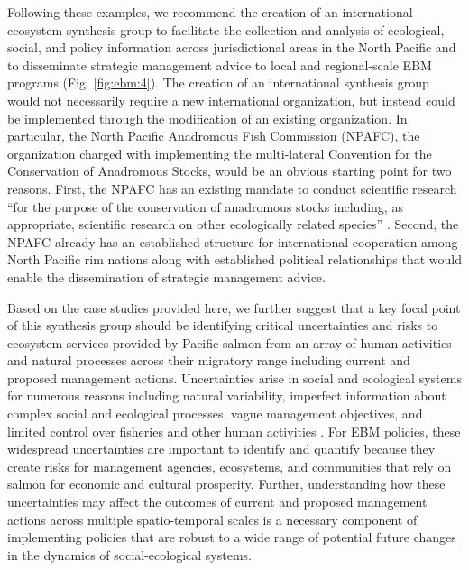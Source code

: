 Following these examples, we recommend the creation of an international
ecosystem synthesis group to facilitate the collection and analysis of
ecological, social, and policy information across jurisdictional areas in the
North Pacific and to disseminate strategic management advice to local and
regional-scale EBM programs (Fig. \ref{fig:ebm:4}). The creation of an
international synthesis group would not necessarily require a new international
organization, but instead could be implemented through the modification of an
existing organization. In particular, the North Pacific Anadromous Fish
Commission (NPAFC), the organization charged with implementing the multi-lateral
Convention for the Conservation of Anadromous Stocks, would be an obvious
starting point for two reasons. First, the NPAFC has an existing mandate to
conduct scientific research ``for the purpose of the conservation of anadromous
stocks including, as appropriate, scientific research on other ecologically
related species'' \citep{CCAS1992}. Second, the NPAFC already has an established
structure for international cooperation among North Pacific rim nations along
with established political relationships that would enable the dissemination of
strategic management advice.

Based on the case studies provided here, we further suggest that a key
focal point of this synthesis group should be identifying critical
uncertainties and risks to ecosystem services provided by Pacific salmon
from an array of human activities and natural processes across their
migratory range including current and proposed management actions.
Uncertainties arise in social and ecological systems for numerous
reasons including natural variability, imperfect information about
complex social and ecological processes, vague management objectives,
and limited control over fisheries and other human activities
\citep{Peterman2004a}. For EBM policies, these widespread uncertainties
are important to identify and quantify because they create risks for
management agencies, ecosystems, and communities that rely on salmon for
economic and cultural prosperity. Further, understanding how these
uncertainties may affect the outcomes of current and proposed management
actions across multiple spatio-temporal scales is a necessary component
of implementing policies that are robust to a wide range of potential
future changes in the dynamics of social-ecological systems.

